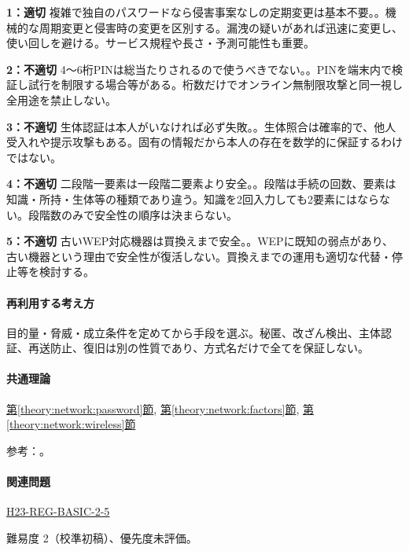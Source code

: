 \noindent\textbf{1：適切} 複雑で独自のパスワードなら侵害事案なしの定期変更は基本不要。。機械的な周期変更と侵害時の変更を区別する。漏洩の疑いがあれば迅速に変更し、使い回しを避ける。サービス規程や長さ・予測可能性も重要。\par

\noindent\textbf{2：不適切} 4〜6桁PINは総当たりされるので使うべきでない。。PINを端末内で検証し試行を制限する場合等がある。桁数だけでオンライン無制限攻撃と同一視し全用途を禁止しない。\par

\noindent\textbf{3：不適切} 生体認証は本人がいなければ必ず失敗。。生体照合は確率的で、他人受入れや提示攻撃もある。固有の情報だから本人の存在を数学的に保証するわけではない。\par

\noindent\textbf{4：不適切} 二段階一要素は一段階二要素より安全。。段階は手続の回数、要素は知識・所持・生体等の種類であり違う。知識を2回入力しても2要素にはならない。段階数のみで安全性の順序は決まらない。\par

\noindent\textbf{5：不適切} 古いWEP対応機器は買換えまで安全。。WEPに既知の弱点があり、古い機器という理由で安全性が復活しない。買換えまでの運用も適切な代替・停止等を検討する。\par

\paragraph{再利用する考え方} 目的量・脅威・成立条件を定めてから手段を選ぶ。秘匿、改ざん検出、主体認証、再送防止、復旧は別の性質であり、方式名だけで全てを保証しない。

\paragraph{共通理論} \hyperref[theory:network:password]{第\ref*{theory:network:password}節}, \hyperref[theory:network:factors]{第\ref*{theory:network:factors}節}, \hyperref[theory:network:wireless]{第\ref*{theory:network:wireless}節}

\par 参考：\cite{net_nist2017,net_nist2025,net_wep}。

\paragraph{関連問題} \hyperref[q:h23-reg-basic-2-5]{H23-REG-BASIC-2-5}

\par 難易度 2（校準初稿）、優先度未評価。

